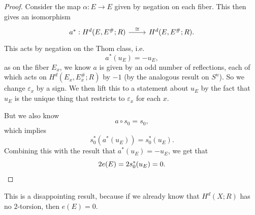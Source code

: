 \documentclass[a4paper]{article}
\theoremstyle{definition}
\begin{document}
\begin{proof}
  Consider the map $\alpha: E \to E$ given by negation on each fiber. This then gives an isomorphism
  \[
    \begin{tikzcd}
      a^*: H^d(E, E^\#; R) \ar[r, "\cong"] & H^d(E, E^\#; R).
    \end{tikzcd}
  \]
  This acts by negation on the Thom class, i.e.
  \[
    a^*(u_E) = - u_E,
  \]
  as on the fiber $E_x$, we know $a$ is given by an odd number of reflections, each of which acts on $H^d(E_x, E_x^\#; R)$ by $-1$ (by the analogous result on $S^n$). So we change $\varepsilon_x$ by a sign. We then lift this to a statement about $u_E$ by the fact that $u_E$ is the unique thing that restricts to $\varepsilon_x$ for each $x$.

  But we also know
  \[
    a \circ s_0 = s_0,
  \]
  which implies
  \[
    s_0^*(a^*(u_E)) = s_0^*(u_E).
  \]
  Combining this with the result that $a^*(u_E) = -u_E$, we get that
  \[
    2 e(E) = 2 s_0^*(u_E) = 0.\qedhere
  \]
\end{proof}
This is a disappointing result, because if we already know that $H^d(X; R)$ has no $2$-torsion, then $e(E) = 0$.
\end{document}
